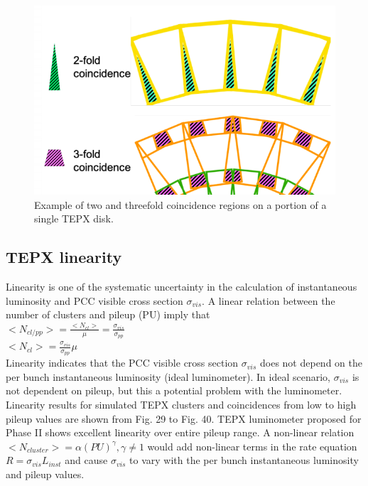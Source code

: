 \begin{figure}[H]
  \centering
  \includegraphics[width=0.6\columnwidth]{./23coin.png}
  \caption{\onehalfspacing Example of two and threefold coincidence regions on a portion of a single TEPX disk.}
  \label{fig:CMS}
\end{figure}

\subsection{TEPX linearity}

Linearity is one of the systematic uncertainty in the calculation of instantaneous luminosity and PCC visible cross section $\sigma_{vis}$. A linear relation between the number of clusters and pileup (PU) imply that \\

$<N_{cl/pp}> = \frac{<N_{cl}>}{\mu} = \frac{\sigma_{vis}}{\sigma_{pp}}$ \\

$<N_{cl}> =  \frac{\sigma_{vis}}{\sigma_{pp}} \mu $ \\

Linearity indicates that the PCC visible cross section $\sigma_{vis}$ does not depend on the per bunch instantaneous luminosity (ideal luminometer). In ideal scenario, $\sigma_{vis}$ is not dependent on pileup, but this a potential problem with the luminometer. Linearity results for simulated TEPX clusters and coincidences from low to high pileup values are shown from Fig. 29 to Fig. 40. TEPX luminometer proposed for Phase II shows excellent linearity over entire pileup range. A non-linear relation $<N_{cluster}> = \alpha (PU)^{\gamma}, \gamma \neq 1$ would add non-linear terms in the rate equation $R = \sigma_{vis} L_{inst}$  and cause $\sigma_{vis}$ to vary with the per bunch instantaneous luminosity and pileup values.


